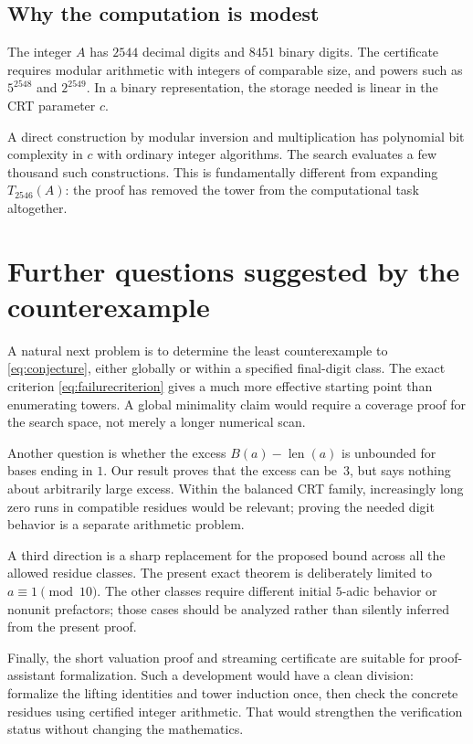 \documentclass[11pt,a4paper]{article}
\theoremstyle{definition}
\theoremstyle{remark}
\newcommand{\len}{\operatorname{len}}
\begin{document}
\subsection{Why the computation is modest}
The integer $A$ has $2544$ decimal digits and $8451$ binary digits. The certificate requires modular arithmetic with integers of comparable size, and powers such as $5^{2548}$ and $2^{2549}$. In a binary representation, the storage needed is linear in the CRT parameter $c$.

A direct construction by modular inversion and multiplication has polynomial bit complexity in $c$ with ordinary integer algorithms. The search evaluates a few thousand such constructions. This is fundamentally different from expanding $T_{2546}(A)$: the proof has removed the tower from the computational task altogether.

\section{Further questions suggested by the counterexample}
\label{sec:future}
A natural next problem is to determine the least counterexample to \eqref{eq:conjecture}, either globally or within a specified final-digit class. The exact criterion \eqref{eq:failurecriterion} gives a much more effective starting point than enumerating towers. A global minimality claim would require a coverage proof for the search space, not merely a longer numerical scan.

Another question is whether the excess $B(a)-\len(a)$ is unbounded for bases ending in $1$. Our result proves that the excess can be~$3$, but says nothing about arbitrarily large excess. Within the balanced CRT family, increasingly long zero runs in compatible residues would be relevant; proving the needed digit behavior is a separate arithmetic problem.

A third direction is a sharp replacement for the proposed bound across all the allowed residue classes. The present exact theorem is deliberately limited to $a\equiv1\pmod{10}$. The other classes require different initial $5$-adic behavior or nonunit prefactors; those cases should be analyzed rather than silently inferred from the present proof.

Finally, the short valuation proof and streaming certificate are suitable for proof-assistant formalization. Such a development would have a clean division: formalize the lifting identities and tower induction once, then check the concrete residues using certified integer arithmetic. That would strengthen the verification status without changing the mathematics.
\end{document}
